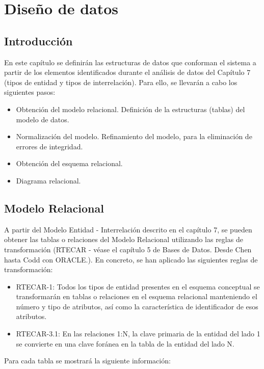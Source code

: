 \chapter{Diseño de datos} \label{cap:diseño_datos}

\section{Introducción}
En este capítulo se definirán las estructuras de datos que conforman el sistema a partir de los elementos identificados durante el análisis de datos del Capítulo 7 (tipos de entidad y tipos de interrelación). Para ello, se llevarán a cabo los siguientes pasos:

\begin{itemize}
    \item Obtención del modelo relacional. Definición de la estructuras (tablas) del modelo de datos.
    \item Normalización del modelo. Refinamiento del modelo, para la eliminación de errores de integridad.
    \item Obtención del esquema relacional.
    \item Diagrama relacional.
\end{itemize}

 \section{Modelo Relacional}\label{sec:modelo-relacional}
A partir del Modelo Entidad - Interrelación descrito en el capítulo 7, se pueden obtener las tablas o relaciones del Modelo Relacional utilizando las reglas de transformación (RTECAR - véase el capítulo 5 de Bases de Datos. Desde Chen hasta Codd con ORACLE.\cite{reglasBD}). En concreto, se han aplicado las siguientes reglas de transformación:

\begin{itemize}
    \item RTECAR-1: Todos los tipos de entidad presentes en el esquema conceptual se transformarán en tablas o relaciones en el esquema relacional manteniendo el número y tipo de atributos, así como la característica de identificador de esos atributos.
    \item RTECAR-3.1: En las relaciones 1:N, la clave primaria de la entidad del lado 1 se convierte en una clave foránea en la tabla de la entidad del lado N.
\end{itemize}

Para cada tabla se mostrará la siguiente información:

